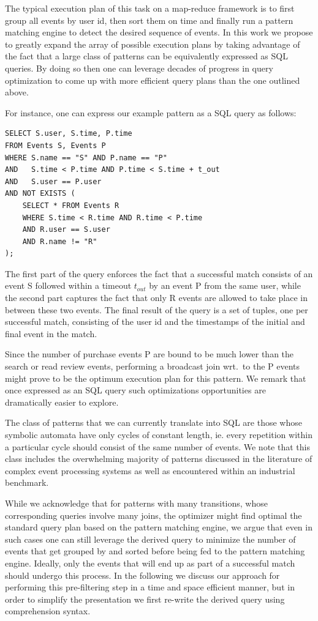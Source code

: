 The typical execution plan of this task on a map-reduce framework is to first
group all events by user id, then sort them on time and finally run a pattern
matching engine to detect the desired sequence of events.
In this work we propose to greatly expand the array of possible execution plans
by taking advantage of the fact that a large class of patterns can be
equivalently expressed as SQL queries.
By doing so then one can leverage decades of progress in query optimization to
come up with more efficient query plans than the one outlined above.

For instance, one can express our example pattern as a SQL query as follows:
\begin{verbatim}
SELECT S.user, S.time, P.time
FROM Events S, Events P
WHERE S.name == "S" AND P.name == "P"  
AND   S.time < P.time AND P.time < S.time + t_out
AND   S.user == P.user
AND NOT EXISTS ( 
    SELECT * FROM Events R
    WHERE S.time < R.time AND R.time < P.time
    AND R.user == S.user
    AND R.name != "R"
); 
\end{verbatim}

The first part of the query enforces the fact that a successful match consists
of an event S followed within a timeout $t_{out}$ by an event P from the same user,
while the second part captures the fact that only R events are allowed to take
place in between these two events.
The final result of the query is a set of tuples, one per successful match,
consisting of the user id and the timestamps of the initial and final event
in the match.

Since the number of purchase events P are bound to be much lower than the
search or read review events, performing a broadcast join wrt.\ to the P events
might prove to be the optimum execution plan for this pattern. We remark that
once expressed as an SQL query such optimizations opportunities are dramatically
easier to explore.



The class of patterns that we can currently translate into SQL are those whose
symbolic automata have only cycles of constant length, ie. every repetition
within a particular cycle should consist of the same number of events. 
We note that this class includes the overwhelming majority of patterns discussed
in the literature of complex event processing systems as well as encountered
within an industrial benchmark.

While we acknowledge that for patterns with many transitions, whose
corresponding queries involve many joins, the optimizer might find optimal the
standard query plan based on the pattern matching engine,
we argue that even in such cases one can still leverage the derived query to
minimize the number of events that get grouped by and sorted before being fed to
the pattern matching engine.
Ideally, only the events that will end up as part of a successful match should
undergo this process.
In the following we discuss our approach for performing this pre-filtering step
in a time and space efficient manner, but in order to simplify the presentation
we first re-write the derived query using comprehension syntax.

